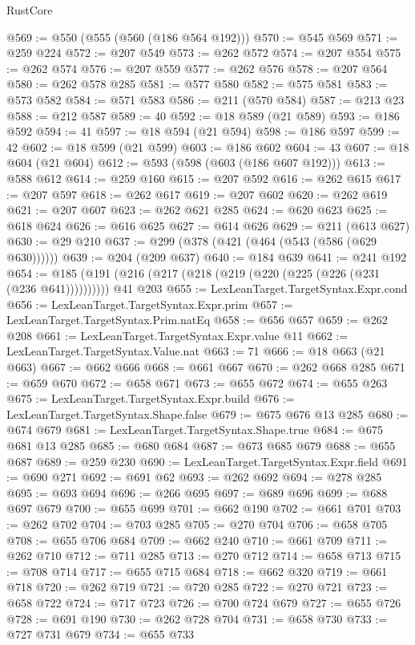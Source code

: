 \begin{lexlean}{RustCore}
\begin{coremodule}
@569 := @550 (@555 (@560 (@186 @564 @192)))
@570 := @545 @569
@571 := @259 @224
@572 := @207 @549
@573 := @262 @572
@574 := @207 @554
@575 := @262 @574
@576 := @207 @559
@577 := @262 @576
@578 := @207 @564
@580 := @262 @578 @285
@581 := @577 @580
@582 := @575 @581
@583 := @573 @582
@584 := @571 @583
@586 := @211 (@570 @584)
@587 := @213 @23
@588 := @212 @587
@589 := 40
@592 := @18 @589 (@21 @589)
@593 := @186 @592
@594 := 41
@597 := @18 @594 (@21 @594)
@598 := @186 @597
@599 := 42
@602 := @18 @599 (@21 @599)
@603 := @186 @602
@604 := 43
@607 := @18 @604 (@21 @604)
@612 := @593 (@598 (@603 (@186 @607 @192)))
@613 := @588 @612
@614 := @259 @160
@615 := @207 @592
@616 := @262 @615
@617 := @207 @597
@618 := @262 @617
@619 := @207 @602
@620 := @262 @619
@621 := @207 @607
@623 := @262 @621 @285
@624 := @620 @623
@625 := @618 @624
@626 := @616 @625
@627 := @614 @626
@629 := @211 (@613 @627)
@630 := @29 @210
@637 := @299 (@378 (@421 (@464 (@543 (@586 (@629 @630))))))
@639 := @204 (@209 @637)
@640 := @184 @639
@641 := @241 @192
@654 := @185 (@191 (@216 (@217 (@218 (@219 (@220 (@225 (@226 (@231 (@236 @641)))))))))) @41 @203
@655 := LexLeanTarget.TargetSyntax.Expr.cond
@656 := LexLeanTarget.TargetSyntax.Expr.prim
@657 := LexLeanTarget.TargetSyntax.Prim.natEq
@658 := @656 @657
@659 := @262 @208
@661 := LexLeanTarget.TargetSyntax.Expr.value @11
@662 := LexLeanTarget.TargetSyntax.Value.nat
@663 := 71
@666 := @18 @663 (@21 @663)
@667 := @662 @666
@668 := @661 @667
@670 := @262 @668 @285
@671 := @659 @670
@672 := @658 @671
@673 := @655 @672
@674 := @655 @263
@675 := LexLeanTarget.TargetSyntax.Expr.build
@676 := LexLeanTarget.TargetSyntax.Shape.false
@679 := @675 @676 @13 @285
@680 := @674 @679
@681 := LexLeanTarget.TargetSyntax.Shape.true
@684 := @675 @681 @13 @285
@685 := @680 @684
@687 := @673 @685 @679
@688 := @655 @687
@689 := @259 @230
@690 := LexLeanTarget.TargetSyntax.Expr.field
@691 := @690 @271
@692 := @691 @62
@693 := @262 @692
@694 := @278 @285
@695 := @693 @694
@696 := @266 @695
@697 := @689 @696
@699 := @688 @697 @679
@700 := @655 @699
@701 := @662 @190
@702 := @661 @701
@703 := @262 @702
@704 := @703 @285
@705 := @270 @704
@706 := @658 @705
@708 := @655 @706 @684
@709 := @662 @240
@710 := @661 @709
@711 := @262 @710
@712 := @711 @285
@713 := @270 @712
@714 := @658 @713
@715 := @708 @714
@717 := @655 @715 @684
@718 := @662 @320
@719 := @661 @718
@720 := @262 @719
@721 := @720 @285
@722 := @270 @721
@723 := @658 @722
@724 := @717 @723
@726 := @700 @724 @679
@727 := @655 @726
@728 := @691 @190
@730 := @262 @728 @704
@731 := @658 @730
@733 := @727 @731 @679
@734 := @655 @733

\end{coremodule}
\end{lexlean}
